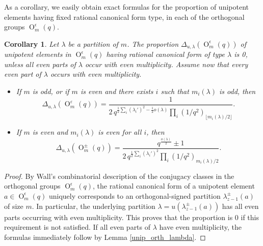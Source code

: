 \documentclass[a4paper, 12pt, oneside]{amsart}
\newtheorem{coro}[prop]{Corollary}
\theoremstyle{definition}
\DeclareMathOperator{\Or}{O}
\begin{document}
As a corollary, we easily obtain exact formulas for the proportion of unipotent elements having fixed rational canonical form type, in each of the orthogonal groups $\Or^{\epsilon}_{m}(q)$.
\begin{coro}
Let $\lambda$ be a partition of $m$. The proportion $\Delta_{u,\lambda}(\Or^{\epsilon}_m(q))$ of unipotent elements in $\Or^{\epsilon}_{m}(q)$ having rational canonical form of type $\lambda$ is 0, unless all even parts of $\lambda$ occur with even multiplicity. 
Assume now that every even part of $\lambda$ occurs with even multiplicity. 
\begin{itemize}
\item If $m$ is odd, or if $m$ is even and there exists $i$ such that $m_i(\lambda)$ is odd, then
\[
\Delta_{u,\lambda}(\Or_m^{\varepsilon}(q))
=
\frac{1}{
2\,q^{\frac12\sum_i (\lambda_i')^2-\frac12 o(\lambda)}
\displaystyle\prod_i (1/q^2)_{\lfloor m_i(\lambda)/2 \rfloor}
}.
\]

\item If $m$ is even and $m_i(\lambda)$ is even for all $i$, then
\[
\Delta_{u,\lambda}(\Or_m^{\pm}(q))
=
\frac{q^{\frac{o(\lambda)}{2}} \pm 1}{
2\,q^{\frac12\sum_i (\lambda_i')^2}
\displaystyle\prod_i (1/q^2)_{m_i(\lambda)/2}
}.
\]
\end{itemize}
\end{coro}
\begin{proof}
By Wall's combinatorial description of the conjugacy classes in the orthogonal groups $\Or^{\epsilon}_m(q)$, the rational canonical form of a unipotent element $a \in \Or^{\epsilon}_{m}(q)$ uniquely corresponds to an orthogonal-signed partition $\lambda^{\pm}_{z-1}(a)$ of size $m$. In particular, the underlying partition $\lambda=u(\lambda^{\pm}_{z-1}(a))$ has all even parts occurring with even multiplicity. This proves that the proportion is $0$ if this requirement is not satisfied. If all even parts of $\lambda$ have even multiplicity, the formulas immediately follow by Lemma \ref{unip_orth_lambda}.
\end{proof}
\end{document}
